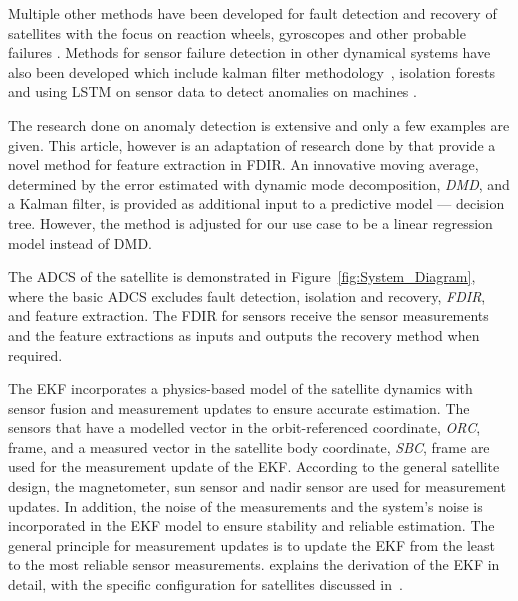 \documentclass[letterpaper, 10 pt, conference]{ieeeconf}  %
\begin{document}
Multiple other methods have been developed for fault detection and recovery of satellites with the focus on reaction wheels, gyroscopes and other probable failures \cite{Tudoroiu2007, Pilastre2020, rahimi2020fault, jin2008fault, wander2013innovative, ibrahim2018machine, ibrahim2020machine}. Methods for sensor failure detection in other dynamical systems have also been developed which include kalman filter methodology~\cite{Ciftciogl1991}, isolation forests~\cite{Liu2021} and using LSTM on sensor data to detect anomalies on machines \cite{Malhotra2016}. 

The research done on anomaly detection is extensive and only a few examples are given. This article, however is an adaptation of research done by \textcite{DeSilva2020} that provide a novel method for feature extraction in FDIR. An innovative moving average, determined by the error estimated with dynamic mode decomposition, \emph{DMD}, and a Kalman filter, is provided as additional input to a predictive model --- decision tree. However, the method is adjusted for our use case to be a linear regression model instead of DMD.


The ADCS of the satellite is demonstrated in Figure~\ref{fig:System_Diagram}, where the basic ADCS excludes fault detection, isolation and recovery, \emph{FDIR}, and feature extraction. The FDIR for sensors receive the sensor measurements and the feature extractions as inputs and outputs the recovery method when required. 

The EKF incorporates a physics-based model of the satellite dynamics with sensor fusion and measurement updates to ensure accurate estimation. The sensors that have a modelled vector in the orbit-referenced coordinate, \emph{ORC}, frame, and a measured vector in the satellite body coordinate, \emph{SBC}, frame are used for the measurement update of the EKF. According to the general satellite design, the magnetometer, sun sensor and nadir sensor are used for measurement updates. In addition, the noise of the measurements and the system's noise is incorporated in the EKF model to ensure stability and reliable estimation. The general principle for measurement updates is to update the EKF from the least to the most reliable sensor measurements. \textcite{Jones2017} explains the derivation of the EKF in detail, with the specific configuration for satellites discussed in~\textcite{JansevanVuuren2015}.
\end{document}
